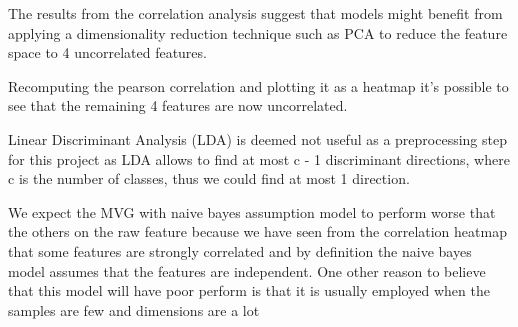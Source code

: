 \documentclass[12pt,a4paper]{article}
\begin{document}
The results from the correlation analysis suggest that models might benefit from applying a dimensionality reduction technique such as PCA to reduce the feature space to 4 uncorrelated features.
\begin{figure}[H]
    \begin{center}
    \end{center}
\end{figure}
Recomputing the pearson correlation and plotting it as a heatmap it's possible to see that the remaining 4 features are now uncorrelated.

\clearpage





Linear Discriminant Analysis (LDA) is deemed not useful as a preprocessing step for this project as LDA allows to find at most c - 1 discriminant directions, where c is the number of classes, thus we could find at most 1 direction.

We expect the MVG with naive bayes assumption model to perform worse that the others on the raw feature because we have seen from the correlation heatmap that some features are strongly correlated and by definition the naive bayes model assumes that the features are independent.                                          
One other reason to believe that this model will have poor perform is that it is usually employed 
when the samples are few and dimensions are a lot
\end{document}
